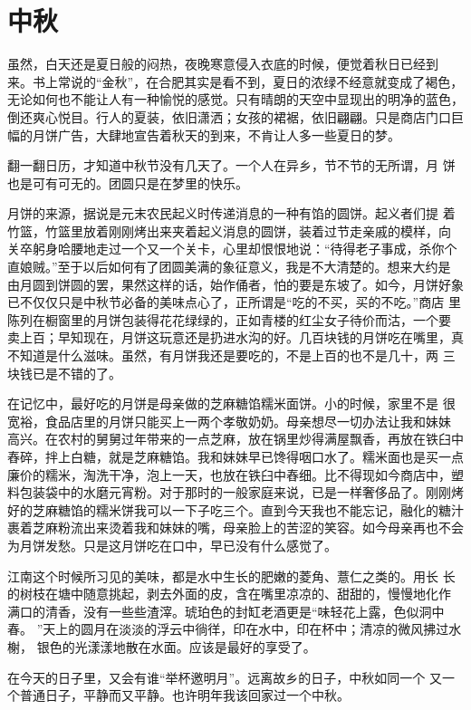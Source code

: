 \chapter[中秋]{中\qquad 秋}

虽然，白天还是夏日般的闷热，夜晚寒意侵入衣底的时候，便觉着秋日已经到
来。书上常说的“金秋”，在合肥其实是看不到，夏日的浓绿不经意就变成了褐色，
无论如何也不能让人有一种愉悦的感觉。只有晴朗的天空中显现出的明净的蓝色，
倒还爽心悦目。行人的夏装，依旧潇洒；女孩的裙裾，依旧翩翩。只是商店门口巨
幅的月饼广告，大肆地宣告着秋天的到来，不肯让人多一些夏日的梦。

翻一翻日历，才知道中秋节没有几天了。一个人在异乡，节不节的无所谓，月
饼也是可有可无的。团圆只是在梦里的快乐。

月饼的来源，据说是元末农民起义时传递消息的一种有馅的圆饼。起义者们提
着竹篮，竹篮里放着刚刚烤出来夹着起义消息的圆饼，装着过节走亲戚的模样，向
关卒躬身哈腰地走过一个又一个关卡，心里却恨恨地说：“待得老子事成，杀你个
直娘贼。”至于以后如何有了团圆美满的象征意义，我是不大清楚的。想来大约是
由月圆到饼圆的罢，果然这样的话，始作俑者，怕的要是东坡了。如今，月饼好象
已不仅仅只是中秋节必备的美味点心了，正所谓是“吃的不买，买的不吃。”商店
里陈列在橱窗里的月饼包装得花花绿绿的，正如青楼的红尘女子待价而沽，一个要
卖上百；早知现在，月饼这玩意还是扔进水沟的好。几百块钱的月饼吃在嘴里，真
不知道是什么滋味。虽然，有月饼我还是要吃的，不是上百的也不是几十，两
三块钱已是不错的了。

在记忆中，最好吃的月饼是母亲做的芝麻糖馅糯米面饼。小的时候，家里不是
很宽裕，食品店里的月饼只能买上一两个孝敬奶奶。母亲想尽一切办法让我和妹妹
高兴。在农村的舅舅过年带来的一点芝麻，放在锅里炒得满屋飘香，再放在铁臼中
舂碎，拌上白糖，就是芝麻糖馅。我和妹妹早已馋得咽口水了。糯米面也是买一点
廉价的糯米，淘洗干净，泡上一天，也放在铁臼中舂细。比不得现如今商店中，塑
料包装袋中的水磨元宵粉。对于那时的一般家庭来说，已是一样奢侈品了。刚刚烤
好的芝麻糖馅的糯米饼我可以一下子吃三个。直到今天我也不能忘记，融化的糖汁
裹着芝麻粉流出来烫着我和妹妹的嘴，母亲脸上的苦涩的笑容。如今母亲再也不会
为月饼发愁。只是这月饼吃在口中，早已没有什么感觉了。

江南这个时候所习见的美味，都是水中生长的肥嫩的菱角、薏仁之类的。用长
长的树枝在塘中随意挑起，剥去外面的皮，含在嘴里凉凉的、甜甜的，慢慢地化作
满口的清香，没有一些些渣滓。琥珀色的封缸老酒更是“味轻花上露，色似洞中春。
”天上的圆月在淡淡的浮云中徜徉，印在水中，印在杯中；清凉的微风拂过水榭，
银色的光漾漾地散在水面。应该是最好的享受了。

在今天的日子里，又会有谁“举杯邀明月”。远离故乡的日子，中秋如同一个
又一个普通日子，平静而又平静。也许明年我该回家过一个中秋。
